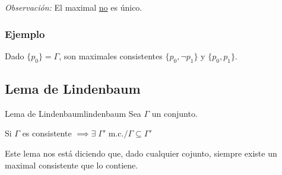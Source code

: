 \bigskip
\textit{Observación:}
El maximal \underline{no} es único.

\subsubsection{Ejemplo}

Dado $\{ p_0 \} = \Gamma$, son maximales consistentes $\{ p_0, \neg p_1 \}$ y
$\{ p_0, p_1 \}$.

\subsection{Lema de Lindenbaum}

\begin{lema}{Lema de Lindenbaum}{lindenbaum}
    Sea $\Gamma$ un conjunto.

    \medskip

    Si $\Gamma$ es consistente $\implies \exists \; \Gamma' \text{ m.c.}/
    \Gamma \subseteq \Gamma'$ 
\end{lema}


Este lema nos está diciendo que, dado cualquier cojunto, siempre existe un
maximal consistente que lo contiene.


